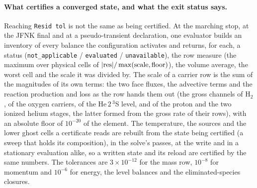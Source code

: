 \documentclass[english,a4paper]{my_memo}
\begin{document}
\paragraph{What certifies a converged state, and what the exit status says.}
Reaching \texttt{Resid tol} is not the same as being certified. At the
marching stop, at the JFNK final and at a pseudo-transient declaration, one
evaluator builds an inventory of every balance the configuration activates
and returns, for each, a status (\texttt{not\_applicable} /
\texttt{evaluated} / \texttt{unavailable}), the row measure (the maximum over
physical cells of $|{\rm res}|/\max({\rm scale},{\rm floor})$), the volume
average, the worst cell and the scale it was divided by. The scale of a
carrier row is the sum of the magnitudes of its own terms: the two face
fluxes, the advective terms and the reaction production and loss as the row
hands them out (the gross channels of H$_2$, of the oxygen carriers, of the
He\,$2\,^3$S level, and of the proton and the two ionized helium stages, the
latter formed from the gross rate of their rows), with an
absolute floor of $10^{-20}$ of the element. The temperature, the sources and
the lower ghost cells a certificate reads are rebuilt from the state being
certified (a sweep that holds its composition), in the solve's passes, at the
write and in a stationary evaluation alike, so a written state and its reload
are certified by the same numbers. The tolerances are
$3\times10^{-12}$ for the mass row, $10^{-8}$ for momentum and $10^{-6}$ for
energy, the level balances and the eliminated-species closures.
\end{document}
